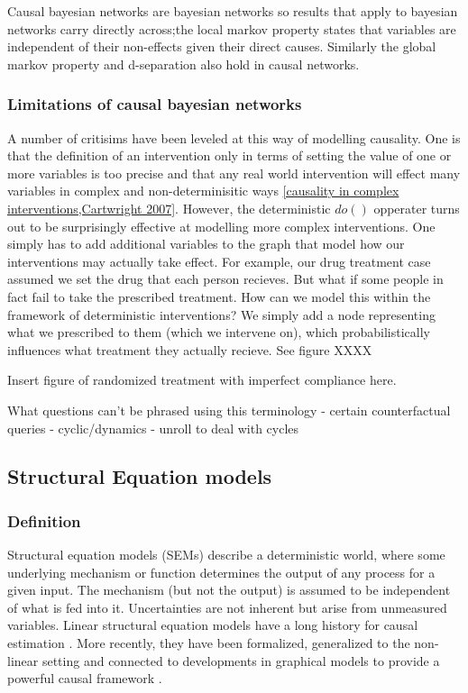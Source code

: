 \documentclass[11pt,a4paper,oneside]{book}
\begin{document}
Causal bayesian networks are bayesian networks so results that apply to bayesian networks carry directly across;the local markov property states that variables are independent of their non-effects given their direct causes. Similarly the global markov property and d-separation also hold in causal networks. 

\subsubsection*{Limitations of causal bayesian networks}
A number of critisims have been leveled at this way of modelling causality. One is that the definition of an intervention only in terms of setting the value of one or more variables is too precise and that any real world intervention will effect many variables in complex and non-determinisitic ways \ref{causality in complex interventions,Cartwright 2007}. However, the deterministic $do()$ opperater turns out to be surprisingly effective at modelling more complex interventions. One simply has to add additional variables to the graph that model how our interventions may actually take effect. For example, our drug treatment case assumed we set the drug that each person recieves. But what if some people in fact fail to take the prescribed treatment. How can we model this within the framework of deterministic interventions? We simply add a node representing what we prescribed to them (which we intervene on), which probabilistically influences what treatment they actually recieve. See figure XXXX

Insert figure of randomized treatment with imperfect compliance here. 

What questions can't be phrased using this terminology
- certain counterfactual queries
- cyclic/dynamics
- unroll to deal with cycles

\subsection*{Structural Equation models}

\subsubsection*{Definition}
Structural equation models (SEMs) describe a deterministic world, where some underlying mechanism or function determines the output of any process for a given input. The mechanism (but not the output) is assumed to be independent of what is fed into it. Uncertainties are not inherent but arise from unmeasured variables. Linear structural equation models have a long history for causal estimation \cite {Wright1921,Haavelmo1943}. More recently, they have been formalized, generalized to the non-linear setting and connected to developments in graphical models to provide a powerful causal framework \cite{Pearl2000}.
\end{document}
